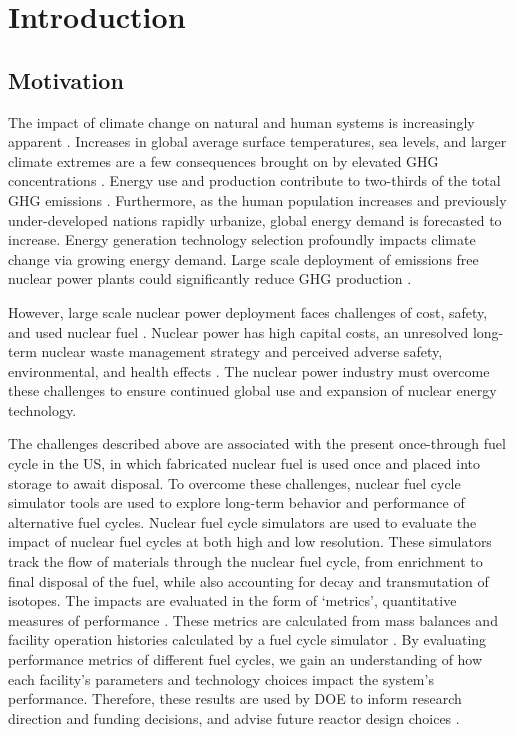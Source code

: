 \chapter[Introduction]{Introduction}
\label{chap:1}

\section{Motivation}
The impact of climate change on natural and human systems 
is increasingly apparent \cite{noauthor_climate_2018}.
Increases in global average 
surface temperatures, sea levels, and larger climate extremes
are a few consequences brought on by elevated \gls{GHG} 
concentrations \cite{noauthor_climate_2018}.
Energy use and production contribute to 
two-thirds of the total \gls{GHG}
emissions \cite{noauthor_climate_2018}.
Furthermore, as the human population increases and previously 
under-developed nations rapidly urbanize, 
global energy demand is forecasted to increase.  
Energy generation technology selection 
profoundly impacts climate change via growing energy demand. 
Large scale deployment of emissions free nuclear power plants 
could significantly reduce GHG production 
\cite{noauthor_climate_2018}.  

However, large scale nuclear power deployment faces
challenges of cost, safety, and used nuclear fuel  
\cite{petti_future_2018}. 
Nuclear power has high capital costs, 
an unresolved long-term nuclear waste management 
strategy and perceived adverse safety, environmental, and health 
effects \cite{petti_future_2018}. 
The nuclear power industry must overcome these challenges 
to ensure continued global use and expansion 
of nuclear energy technology. 

The challenges described above are associated with 
the present once-through fuel cycle in the \gls{US}, 
in which fabricated nuclear fuel is used once and placed into 
storage to await disposal. 
To overcome these challenges, nuclear fuel cycle simulator tools 
are used to explore 
long-term behavior and performance of alternative fuel cycles. 
Nuclear fuel cycle simulators are used to evaluate the impact of 
nuclear fuel cycles at both high and low resolution. 
These simulators track the flow of materials through the nuclear fuel cycle, 
from enrichment to final disposal of the fuel, while also accounting for 
decay and transmutation of isotopes. 
The impacts are evaluated in the form of `metrics', quantitative measures 
of performance \cite{huff_fundamental_2016}. 
These metrics are calculated from mass balances and facility operation 
histories calculated by a fuel cycle simulator \cite{huff_fundamental_2016}. 
By evaluating performance metrics of different fuel cycles, we gain an 
understanding of how each facility's parameters and technology choices 
impact the system's performance. 
Therefore, these results are used by DOE to inform research direction
and funding decisions, and advise future reactor design choices 
\cite{yacout_modeling_2005}.

